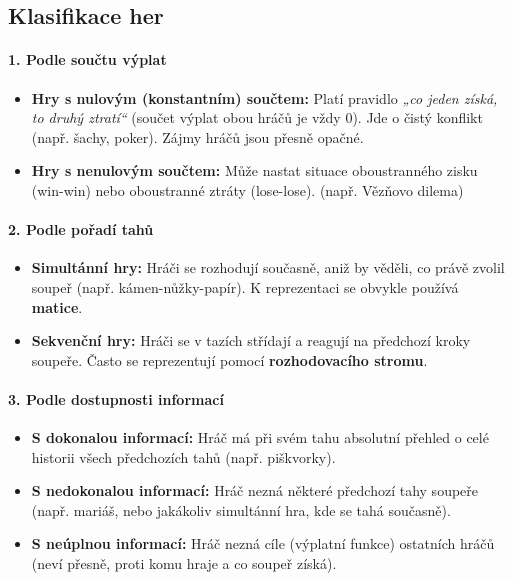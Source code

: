 \subsection{Klasifikace her}

\paragraph*{1. Podle součtu výplat}
\begin{itemize}
    \item \textbf{Hry s nulovým (konstantním) součtem:} Platí pravidlo \textit{„co jeden získá, to druhý ztratí“} (součet výplat obou hráčů je vždy 0). Jde o čistý konflikt (např. šachy, poker). Zájmy hráčů jsou přesně opačné.
    \item \textbf{Hry s nenulovým součtem:} Může nastat situace oboustranného zisku (win-win) nebo oboustranné ztráty (lose-lose). (např. Vězňovo dilema)
\end{itemize}

\paragraph*{2. Podle pořadí tahů}
\begin{itemize}
    \item \textbf{Simultánní hry:} Hráči se rozhodují současně, aniž by věděli, co právě zvolil soupeř (např. kámen-nůžky-papír). K reprezentaci se obvykle používá \textbf{matice}.
    \item \textbf{Sekvenční hry:} Hráči se v tazích střídají a reagují na předchozí kroky soupeře. Často se reprezentují pomocí \textbf{rozhodovacího stromu}.
\end{itemize}

\paragraph*{3. Podle dostupnosti informací}
\begin{itemize}
    \item \textbf{S dokonalou informací:} Hráč má při svém tahu absolutní přehled o celé historii všech předchozích tahů (např. piškvorky).
    \item \textbf{S nedokonalou informací:} Hráč nezná některé předchozí tahy soupeře (např. mariáš, nebo jakákoliv simultánní hra, kde se tahá současně).
    \item \textbf{S neúplnou informací:} Hráč nezná cíle (výplatní funkce) ostatních hráčů (neví přesně, proti komu hraje a co soupeř získá).
\end{itemize}


